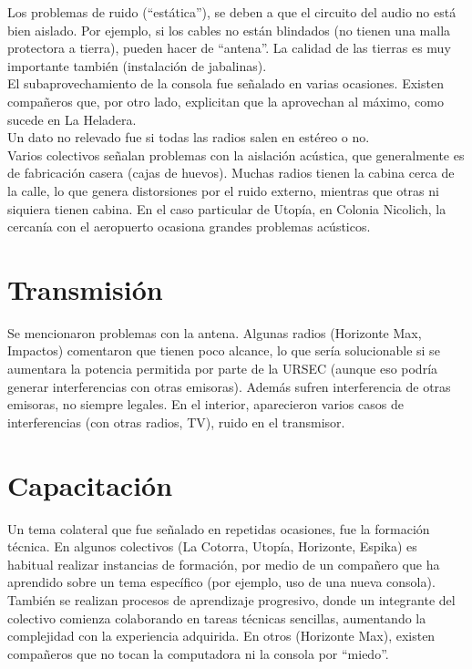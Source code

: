 Los problemas de ruido (``estática''), se deben a que el circuito del audio no está bien aislado. Por ejemplo, si los cables no están blindados (no tienen una malla protectora a tierra), pueden hacer de ``antena''. La calidad de las tierras es muy importante también (instalación de jabalinas).\\

El subaprovechamiento de la consola fue señalado en varias ocasiones. Existen compañeros que, por otro lado, explicitan que la aprovechan al máximo, como sucede en La Heladera.\\

Un dato no relevado fue si todas las radios salen en estéreo o no.\\

Varios colectivos señalan problemas con la aislación acústica, que generalmente es de fabricación casera (cajas de huevos). Muchas radios tienen la cabina cerca de la calle, lo que genera distorsiones por el ruido externo, mientras que otras ni siquiera tienen cabina. En el caso particular de Utopía, en Colonia Nicolich, la cercanía con el aeropuerto ocasiona grandes problemas acústicos.\\

\section{Transmisión}

Se mencionaron problemas con la antena. Algunas radios (Horizonte Max, Impactos) comentaron que tienen poco alcance, lo que sería solucionable si se aumentara la potencia permitida por parte de la URSEC (aunque eso podría generar interferencias con otras emisoras). Además sufren interferencia de otras emisoras, no siempre legales. En el interior, aparecieron varios casos de interferencias (con otras radios, TV), ruido en el transmisor.\\

\section{Capacitación}

\indent Un tema colateral que fue señalado en repetidas ocasiones, fue la formación técnica. En algunos colectivos (La Cotorra, Utopía, Horizonte, Espika) es habitual realizar instancias de formación, por medio de un compañero que ha aprendido sobre un tema específico (por ejemplo, uso de una nueva consola). También se realizan procesos de aprendizaje progresivo, donde un integrante del colectivo comienza colaborando en tareas técnicas sencillas, aumentando la complejidad con la experiencia adquirida. En otros (Horizonte Max), existen compañeros que no tocan la computadora ni la consola por ``miedo''.\\

